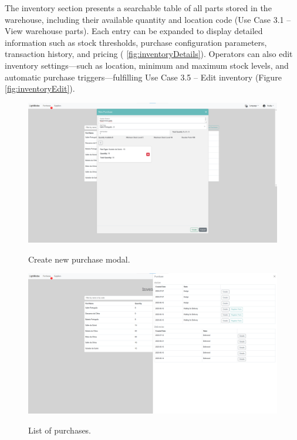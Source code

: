The inventory section presents a searchable table of all parts stored in the warehouse, including their available quantity and location code (Use Case 3.1 – View warehouse parts). Each entry can be expanded to display detailed information such as stock thresholds, purchase configuration parameters, transaction history, and pricing ( \ref{fig:inventoryDetails}). Operators can also edit inventory settings—such as location, minimum and maximum stock levels, and automatic purchase triggers—fulfilling Use Case 3.5 – Edit inventory (Figure \ref{fig:inventoryEdit}).


\begin{figure}[h]
  \caption{Create new purchase modal.}
  \centering
  \includegraphics[width=\textwidth]{figs/Implementation/warehouse/createPurchase}
  \label{fig:createPurchase}
\end{figure}


\begin{figure}[h]
  \caption{List of purchases.}
  \centering
  \includegraphics[width=\textwidth]{figs/Implementation/warehouse/PurchaseList}
  \label{fig:PurchaseList}
\end{figure}






